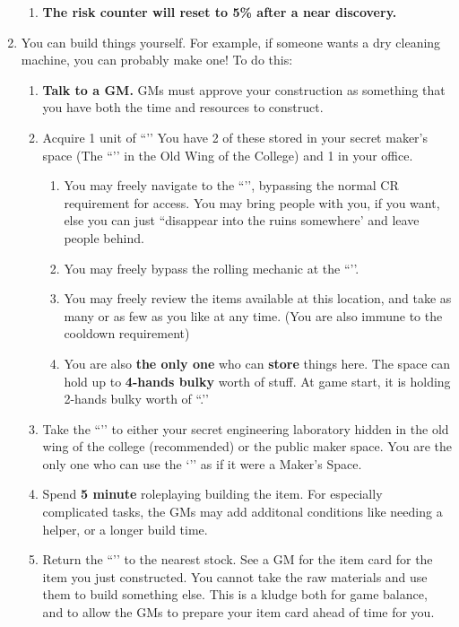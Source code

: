 \documentclass[green]{GL2020}
\begin{document}
\begin{enumerate}
\begin{enumerate}
    \item \textbf{The risk counter will reset to 5\% after a near discovery.}
  \end{enumerate}
  \item You can build things yourself. For example, if someone wants a dry cleaning machine, you can probably make one! To do this:
  \begin{enumerate}
    \item \textbf{Talk to a GM.} GMs must approve your construction as something that you have both the time and resources to construct.
    \item Acquire 1 unit of ``\iMagitechParts{}’’ You have 2 of these stored in your secret maker’s space (The ``\sAlchemyLabOne{}’’ in the Old Wing of the College) and 1 in your office.
  \begin{enumerate}
    \item You may freely navigate to the ``\sAlchemyLabOne{}’’, bypassing the normal CR requirement for access. You may bring people with you, if you want, else you can just ``disappear into the ruins somewhere' and leave people behind.
    \item You may freely bypass the rolling mechanic at  the ``\sAlchemyLabOne{}’’.
    \item You may freely review the items available at this location, and take as many or as few as you like at any time. (You are also immune to the cooldown requirement)
    \item You are also \textbf{the only one} who can \textbf{store} things here. The space can hold up to \textbf{4-hands bulky} worth of stuff. At game start, it is holding 2-hands bulky worth of ``\iMagitechParts{}.’’
  \end{enumerate}
  \item Take the ``\iMagitechParts{}’’ to either your secret engineering laboratory hidden in the old wing of the college (recommended) or the public maker space. You are the only one who can use the `\sAlchemyLabOne{}’’ as if it were a Maker’s Space.
  \item Spend \textbf{5 minute} roleplaying building the item. For especially complicated tasks, the GMs may add additonal conditions like needing a helper, or a longer build time.
  \item Return the ``\iMagitechParts{}’’ to the nearest stock. See a GM for the item card for the item you just constructed. You cannot take the raw materials and use them to build something else. This is a kludge both for game balance, and to allow the GMs to prepare your item card ahead of time for you.
  \end{enumerate}
\end{enumerate}
\end{document}
